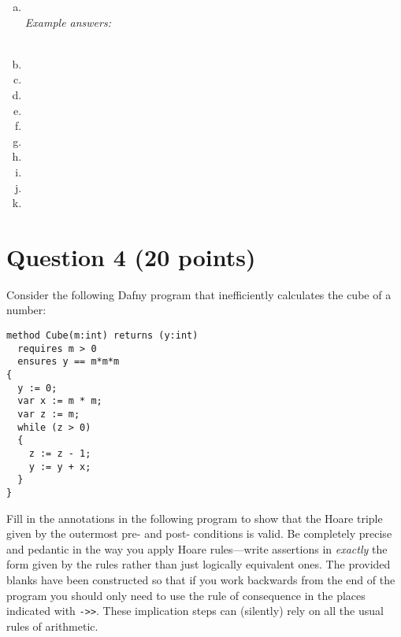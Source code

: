 \documentclass{article}
\begin{document}
\begin{enumerate}[(a)]
\itemsep2em
\item {} \\
  {\em Example answers:}\\
  \\
  \vspace*{-1.5em}
\item {}
\item {}
\item {}
\item {}
\item {}
\item {}
\item {}
\item {}
\item {}
\item {}  
\end{enumerate}

\pagebreak
\section*{Question 4 (20 points)}

Consider the following Dafny program that inefficiently calculates
the cube of a number:

\begin{verbatim}
method Cube(m:int) returns (y:int) 
  requires m > 0
  ensures y == m*m*m
{
  y := 0;
  var x := m * m;
  var z := m;
  while (z > 0) 
  {
    z := z - 1;
    y := y + x;
  }
}
\end{verbatim}

Fill in the annotations in the following program to show that the
Hoare triple given by the outermost pre- and post- conditions is
valid. Be completely precise and pedantic in the way you apply Hoare
rules---write assertions in \emph{exactly} the form given by the
rules rather than just logically equivalent ones. The provided
blanks have been constructed so that if you work backwards from
the end of the program you should only need to use the rule
of consequence in the places indicated with \verb+->>+. These
implication steps can (silently) rely on all the usual rules of
arithmetic.
\end{document}
